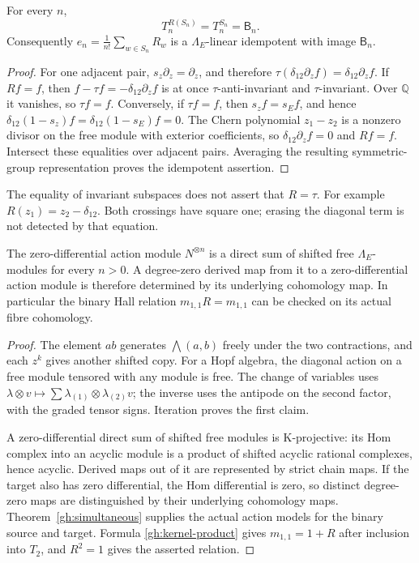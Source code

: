 \begin{lemma}\label{gh:invariants}
For every $n$,
\[
 T_n^{R(S_n)}=T_n^{S_n}=\mathsf B_n .
\]
Consequently
$e_n=\frac1{n!}\sum_{w\in S_n}R_w$ is a
$\Lambda_E$-linear idempotent with image $\mathsf B_n$.
\end{lemma}
\begin{proof}
For one adjacent pair, $s_z\partial_z=\partial_z$, and therefore
$\tau(\delta_{12}\partial_z f)=\delta_{12}\partial_z f$.
If $Rf=f$, then
$f-\tau f=-\delta_{12}\partial_z f$ is at once
$\tau$-anti-invariant and $\tau$-invariant. Over $\mathbb Q$ it
vanishes, so $\tau f=f$.
Conversely, if $\tau f=f$, then $s_zf=s_Ef$, and hence
$\delta_{12}(1-s_z)f=\delta_{12}(1-s_E)f=0$.
The Chern polynomial $z_1-z_2$ is a nonzero divisor on the free
module with exterior coefficients, so
$\delta_{12}\partial_zf=0$ and $Rf=f$.
Intersect these equalities over adjacent pairs. Averaging the
resulting symmetric-group representation proves the idempotent
assertion.
\end{proof}

The equality of invariant subspaces does not assert that $R=\tau$.
For example $R(z_1)=z_2-\delta_{12}$.
Both crossings have square one; erasing the diagonal term is not
detected by that equation.

\begin{lemma}
\label{gh:free-source}
The zero-differential action module $N^{\otimes n}$ is a direct sum
of shifted free $\Lambda_E$-modules for every $n>0$.
A degree-zero derived map from it to a zero-differential action
module is therefore determined by its underlying cohomology map.
In particular the binary Hall relation $m_{1,1}R=m_{1,1}$ can be
checked on its actual fibre cohomology.
\end{lemma}
\begin{proof}
The element $ab$ generates $\bigwedge(a,b)$ freely under the two
contractions, and each $z^k$ gives another shifted copy.
For a Hopf algebra, the diagonal action on a free module tensored
with any module is free. The change of variables uses
$\lambda\otimes v\mapsto\sum\lambda_{(1)}
\otimes\lambda_{(2)}v$; the inverse uses the antipode on the second
factor, with the graded tensor signs. Iteration proves the first
claim.

A zero-differential direct sum of shifted free modules is
K-projective: its Hom complex into an acyclic module is a product of
shifted acyclic rational complexes, hence acyclic. Derived maps
out of it are represented by strict chain maps. If the target also
has zero differential, the Hom differential is zero, so distinct
degree-zero maps are distinguished by their underlying cohomology
maps. Theorem~\ref{gh:simultaneous} supplies the actual action models
for the binary source and target. Formula
\eqref{gh:kernel-product} gives $m_{1,1}=1+R$ after inclusion into
$T_2$, and $R^2=1$ gives the asserted relation.
\end{proof}

